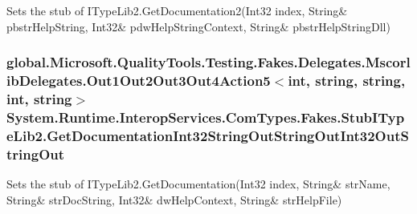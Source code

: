 Sets the stub of I\-Type\-Lib2.\-Get\-Documentation2(Int32 index, String\& pbstr\-Help\-String, Int32\& pdw\-Help\-String\-Context, String\& pbstr\-Help\-String\-Dll)

\hypertarget{class_system_1_1_runtime_1_1_interop_services_1_1_com_types_1_1_fakes_1_1_stub_i_type_lib2_adbdf83c261ca463784a7db29d7c7ac32}{
\subsubsection[{Get\-Documentation\-Int32\-String\-Out\-String\-Out\-Int32\-Out\-String\-Out}]{\setlength{\rightskip}{0pt plus 5cm}global.\-Microsoft.\-Quality\-Tools.\-Testing.\-Fakes.\-Delegates.\-Mscorlib\-Delegates.\-Out1\-Out2\-Out3\-Out4\-Action5$<$int, string, string, int, string$>$ System.\-Runtime.\-Interop\-Services.\-Com\-Types.\-Fakes.\-Stub\-I\-Type\-Lib2.\-Get\-Documentation\-Int32\-String\-Out\-String\-Out\-Int32\-Out\-String\-Out}}\label{class_system_1_1_runtime_1_1_interop_services_1_1_com_types_1_1_fakes_1_1_stub_i_type_lib2_adbdf83c261ca463784a7db29d7c7ac32}


Sets the stub of I\-Type\-Lib2.\-Get\-Documentation(Int32 index, String\& str\-Name, String\& str\-Doc\-String, Int32\& dw\-Help\-Context, String\& str\-Help\-File)

